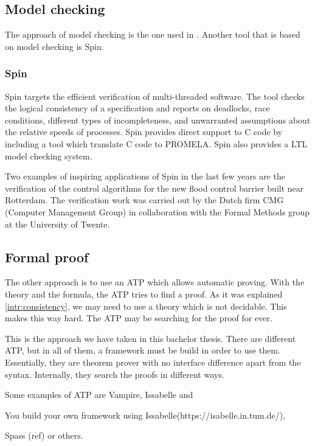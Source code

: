 \subsection{Model checking}

The approach of model checking is the one used in . 
%
Another tool that is based on model checking is Spin.

\subsubsection{Spin}

Spin targets the efficient verification of multi-threaded software. 
%
The tool checks the logical consistency of a specification and reports on deadlocks, race conditions, different types of incompleteness, and unwarranted assumptions about the relative speeds of processes.
%
Spin provides direct support to C code by including a tool which translate C code to \gls{PROMELA}.
%
Spin also provides a \gls{LTL} model checking system.


Two examples of inspiring applications of Spin in the last few years are the verification of the control algorithms for the new flood control barrier built near Rotterdam. 
%
The verification work was carried out by the Dutch firm CMG (Computer Management Group) in collaboration with the Formal Methods group at the University of Twente.

\subsection{Formal proof}

The other approach is to use an \gls{ATP} which allows automatic proving. 
%
With the theory and the formula, the \gls{ATP} tries to find a proof. 
%
As it was explained  \ref{intr:consistency}, we may need to use a theory which is not decidable. 
%
This makes this way hard. 
%
The \gls{ATP} may be searching for the proof for ever.

This is the approach we have taken in this bachelor thesis.
%
There are different \gls{ATP}, but in all of them, a framework must be build in order to use them.
%
Essentially, they are theorem prover with no interface difference apart from the syntax. 
%
Internally, they search the proofs in different ways.

Some examples of \gls{ATP} are Vampire\cite{vampire}, Issabelle \cite{issabelle} and \spass \cite{spass}

You build your own framework using Issabelle(https://isabelle.in.tum.de/), 

Spass (ref) or others.


